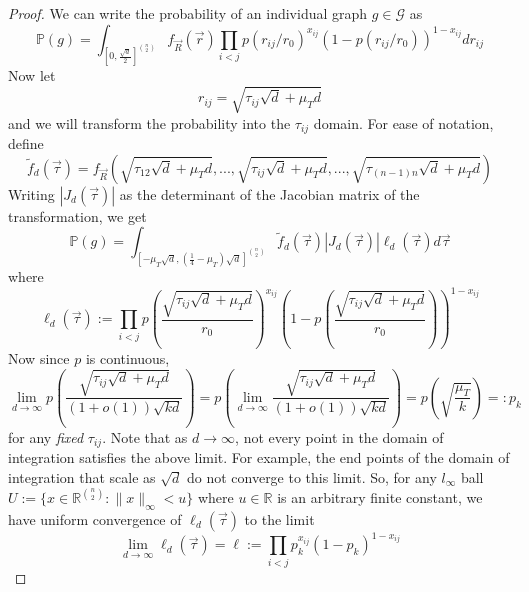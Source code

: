 \documentclass{article}
\newcommand{\tti}{\rightarrow\infty}
\newcommand{\graph}{\mathcal{G}}
\newcommand{\prob}[1]{\mathbb{P}\left(#1\right)}
\begin{document}
\begin{proof}
    We can write the probability of an individual graph $g \in \graph$ as
    \begin{equation}
        \prob{g} = \int_{[0, \frac{\sqrt{d}}{2}]^{\binom{n}{2}}} f_{\vec{R}}(\vec{r})\prod_{i<j}p(r_{ij}/r_0)^{x_{ij}}(1-p(r_{ij}/r_0))^{1-x_{ij}} dr_{ij}
    \end{equation}
    Now let
    \begin{equation}
        r_{ij} = \sqrt{\tau_{ij}\sqrt{d}+\mu_Td}
    \end{equation}
    and we will transform the probability into the $\tau_{ij}$ domain. For ease of notation, define
    \begin{equation}
        \tilde{f}_d(\vec{\tau}) = f_{\vec{R}}\left(\sqrt{\tau_{12}\sqrt{d}+\mu_Td}, ...,\sqrt{\tau_{ij}\sqrt{d}+\mu_Td},..., \sqrt{\tau_{(n-1)n}\sqrt{d}+\mu_Td}\right)
    \end{equation}
    Writing $|J_d(\vec{\tau})|$ as the determinant of the Jacobian matrix of the transformation, we get
    \begin{equation}
        \prob{g} = \int_{[-\mu_T\sqrt{d}, \left(\frac{1}{4}-\mu_T\right)\sqrt{d}]^{\binom{n}{2}}} \tilde{f}_{d}(\vec{\tau})|J_d(\vec{\tau})|\ell_d(\vec{\tau})d\vec{\tau}
    \end{equation}
    where
    \begin{equation}
        \ell_d(\vec{\tau}) := \prod_{i<j} p\left(\frac{\sqrt{\tau_{ij}\sqrt{d}+\mu_Td}}{r_0}\right)^{x_{ij}}\left(1-p\left(\frac{\sqrt{\tau_{ij}\sqrt{d}+\mu_Td}}{r_0}\right)\right)^{1-{x_{ij}}}
    \end{equation}
    Now since $p$ is continuous, 
    \begin{equation}
        \lim_{d\tti} p\left(\frac{\sqrt{\tau_{ij}\sqrt{d}+\mu_Td}}{(1+o(1))\sqrt{kd}}\right) = p\left(\lim_{d\tti}\frac{\sqrt{\tau_{ij}\sqrt{d}+\mu_Td}}{(1+o(1))\sqrt{kd}}\right) = p\left(\sqrt{\frac{\mu_T}{k}}\right) =: p_k
    \end{equation}
    for any \textit{fixed} $\tau_{ij}$. Note that as $d\tti$, not every point in the domain of integration satisfies the above limit. For example, the end points of the domain of integration that scale as $\sqrt{d}$ do not converge to this limit. So, for any $l_{\infty}$ ball $U := \{x \in \mathbb{R}^{\binom{n}{2}} : \|x\|_{\infty} < u\}$ where $u \in \mathbb{R}$ is an arbitrary finite constant, we have uniform convergence of $\ell_d(\vec{\tau})$ to the limit 
    \begin{equation}
        \lim_{d\tti} \ell_{d}(\vec{\tau}) = \ell := \prod_{i<j}p_k^{x_{ij}}(1-p_k)^{1-x_{ij}}

\end{equation}
\end{proof}
\end{document}
